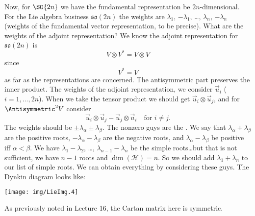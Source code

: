 Now, for $\SO{2n}$ we have the fundamental representation be
$2n$-dimensional. For the Lie algebra business
$\mathfrak{so}(2n)$ the weights are $\lambda_{1}$,
$-\lambda_{1}$, \dots, $\lambda_{n}$, $-\lambda_{n}$ (weights of
the fundamental vector representation, to be precise). What are
the weights of the adjoint representation? We know the adjoint
representation for $\mathfrak{so}(2n)$ is
\begin{equation}
V\otimes V^{*}=V\otimes V
\end{equation}
since
\begin{equation}
V^{*}=V
\end{equation}
as far as the representations are concerned. The antisymmetric
part preserves the inner product. The weights of the adjoint
representation, we consider $\vec{u}_{i}$ ($i=1,\dots,2n$). When
we take the tensor product we should get
$\vec{u}_{i}\otimes\vec{u}_{j}$, and for $\Antisymmetric^{2}V$
consider
\begin{equation}
\vec{u}_{i}\otimes\vec{u}_{j}-\vec{u}_{j}\otimes\vec{u}_{i}
\quad\text{for }i\not=j.
\end{equation}
The weights should be
$\pm\lambda_{\alpha}\pm\lambda_{\beta}$. The nonzero guys are the
. We say that $\lambda_{\alpha}+\lambda_{\beta}$
are the positive roots, $-\lambda_{\alpha}-\lambda_{\beta}$ are
the negative roots, and $\lambda_{\alpha}-\lambda_{\beta}$ be
positive iff $\alpha<\beta$. We have $\lambda_{1}-\lambda_{2}$,
\dots, $\lambda_{n-1}-\lambda_{n}$ be the simple roots\dots but
that is not sufficient, we have $n-1$ roots and
$\dim(\mathscr{H})=n$. So we should add $\lambda_{1}+\lambda_{n}$
to our list of simple roots. We can obtain everything by
considering these guys. The Dynkin diagram looks like:
\begin{center}
  \texttt{[image: img/LieImg.4]}
\end{center}
As previously noted in Lecture 16, the Cartan matrix here is
symmetric. 

